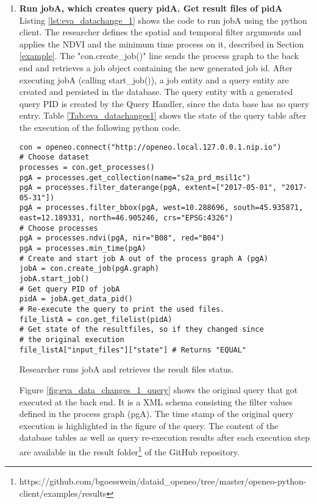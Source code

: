 \documentclass[draft,final]{vutinfth} %
\newenvironment{code}{\captionsetup{type=listing}}{}
\begin{document}
\begin{enumerate}
	\item \textbf{Run jobA, which creates query pidA. Get result files of pidA} \\
	Listing \ref{lst:eva_datachange_1} shows the code to run jobA using the python client. The researcher defines the spatial and temporal filter arguments and applies the NDVI and the minimum time process on it, described in Section \ref{example}. The "con.create\_job()" line sends the process graph to the back end and retrieves a job object containing the new generated job id. After executing jobA (calling start\_job()), a job entity and a query entity are created and persisted in the database. The query entity with a generated query PID is created by the Query Handler, since the data base has no query entry. Table \ref{Tab:eva_datachanges1} shows the state of the query table after the execution of the following python code.
	\begin{code}
		\begin{verbatim}
con = openeo.connect("http://openeo.local.127.0.0.1.nip.io")
# Choose dataset
processes = con.get_processes()
pgA = processes.get_collection(name="s2a_prd_msil1c")
pgA = processes.filter_daterange(pgA, extent=["2017-05-01", "2017-05-31"])
pgA = processes.filter_bbox(pgA, west=10.288696, south=45.935871, 
east=12.189331, north=46.905246, crs="EPSG:4326")
# Choose processes
pgA = processes.ndvi(pgA, nir="B08", red="B04")
pgA = processes.min_time(pgA)
# Create and start job A out of the process graph A (pgA)
jobA = con.create_job(pgA.graph)
jobA.start_job()
# Get query PID of jobA
pidA = jobA.get_data_pid()
# Re-execute the query to print the used files.
file_listA = con.get_filelist(pidA)
# Get state of the resultfiles, so if they changed since 
# the original execution 
file_listA["input_files"]["state"] # Returns "EQUAL"
		\end{verbatim}
		\caption{Researcher runs jobA and retrieves the result files status.}
		\label{lst:eva_datachange_1}
	\end{code}
	Figure \ref{fig:eva_data_changes_1_query} shows the original query that got executed at the back end. It is a XML schema consisting the filter values defined in the process graph (pgA). The time stamp of the original query execution is highlighted in the figure of the query. The content of the database tables as well as query re-execution results after each execution step are available in the result folder\footnote{https://github.com/bgoesswein/dataid\_openeo/tree/master/openeo-python-client/examples/results} of the GitHub repository. 
	

\end{enumerate}
\end{document}
